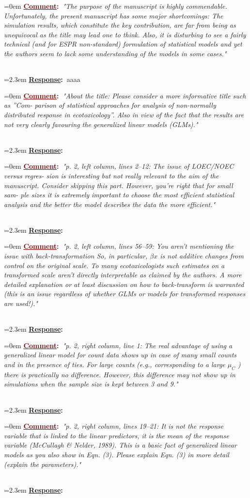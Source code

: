\documentclass[12pt]{article}
\newcommand{\comment}[1]{
	\vspace{2em} \noindent \hangindent=0em \textbf{\textcolor{Maroon}{\uline{Comment}:~}}\emph{"#1"}
	}
\newcommand{\response}[1]{
	\\[0.25em] 
	\hangindent=2.3em \textbf{\textcolor{NavyBlue}{\uline{Response}:~}}#1 
	}
\begin{document}
\comment{The purpose of the manuscript is highly commendable. Unfortunately, the
present manuscript has some major shortcomings: The simulation results,
which constitute the key contribution, are far from being as unequivocal as
the title may lead one to think. Also, it is disturbing to see a fairly technical
(and for ESPR non-standard) formulation of statistical models and yet the
authors seem to lack some understanding of the models in some cases.}
\response{aaaa}

\comment{About the title: Please consider a more informative title such as ”Com-
parison of statistical approaches for analysis of non-normally distributed
response in ecotoxicology”. Also in view of the fact that the results are
not very clearly favouring the generalized linear models (GLMs).}
\response{}

\comment{p. 2, left column, lines 2–12: The issue of LOEC/NOEC versus regres-
sion is interesting but not really relevant to the aim of the manuscript.
Consider skipping this part. However, you’re right that for small sam-
ple sizes it is extremely important to choose the most efficient statistical
analysis and the better the model describes the data the more efficient.}
\response{}

\comment{p. 2, left column, lines 56–59: You aren’t mentioning the issue with
back-transformation So, in particular, $\beta x$ is not additive changes from
control on the original scale. To many ecotoxicologists such estimates
on a transformed scale aren’t directly interpretable as claimed by the
authors. A more detailed explanation or at least discussion on how
to back-transform is warranted (this is an issue regardless of whether
GLMs or models for transformed responses are used!).}
\response{}

\comment{p. 2, right column, line 1: The real advantage of using a generalized
linear model for count data shows up in case of many small counts and
in the presence of ties. For large counts (e.g., corresponding to a large
$\mu_C$ ) there is practically no difference. However, this difference may not
show up in simulations when the sample size is kept between 3 and 9.}
\response{}

\comment{p. 2, right column, lines 19–21: It is not the response variable that is
linked to the linear predictors, it is the mean of the response variable
(McCullagh \& Nelder, 1989). This is a basic fact of generalized linear
models as you also show in Eqn. (3). Please explain Eqn. (3) in more
detail (explain the parameters).}
\response{}
\end{document}
